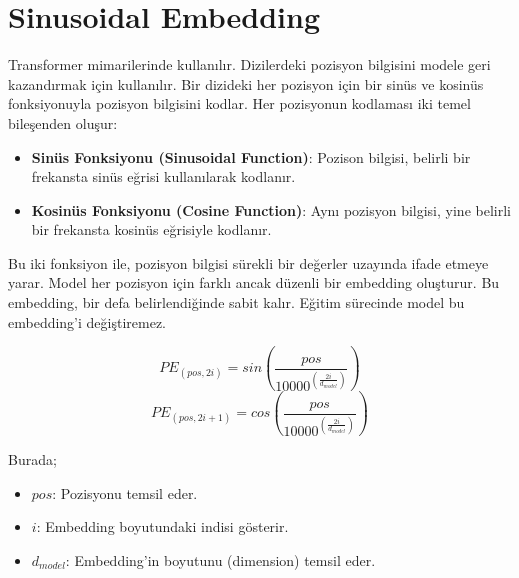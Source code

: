 \section{Sinusoidal Embedding}

Transformer mimarilerinde kullanılır. Dizilerdeki pozisyon bilgisini modele geri kazandırmak için kullanılır. Bir dizideki her pozisyon için bir sinüs ve kosinüs fonksiyonuyla pozisyon bilgisini kodlar. Her pozisyonun kodlaması iki temel bileşenden oluşur:

\begin{itemize}
    \item \textbf{Sinüs Fonksiyonu (Sinusoidal Function)}: Pozison bilgisi, belirli bir frekansta sinüs eğrisi kullanılarak kodlanır.
    \item \textbf{Kosinüs Fonksiyonu (Cosine Function)}: Aynı pozisyon bilgisi, yine belirli bir frekansta kosinüs eğrisiyle kodlanır.
\end{itemize}

Bu iki fonksiyon ile, pozisyon bilgisi sürekli bir değerler uzayında ifade etmeye yarar. Model her pozisyon için farklı ancak düzenli bir embedding oluşturur. Bu embedding, bir defa belirlendiğinde sabit kalır. Eğitim sürecinde model bu embedding'i değiştiremez.

\[ PE_(pos, 2i) = sin(\frac{pos}{10000^(\frac{2i}{d_{model}})}) \]
\[ PE_(pos, 2i+1) = cos(\frac{pos}{10000^(\frac{2i}{d_{model}})}) \]

Burada;

\begin{itemize}
    \item $pos$: Pozisyonu temsil eder.
    \item $i$: Embedding boyutundaki indisi gösterir.
    \item $d_{model}$: Embedding'in boyutunu (dimension) temsil eder.
\end{itemize}


\newpage